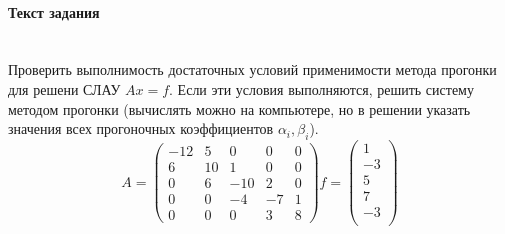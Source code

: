 \paragraph{Текст задания} ~\\
Проверить выполнимость достаточных условий применимости метода прогонки для решени СЛАУ $Ax = f$. Если эти условия выполняются, решить систему методом прогонки (вычислять можно на компьютере, но в решении указать значения всех прогоночных коэффициентов $\alpha_{i}, \beta_{i}$).
\[
  A =
  \begin{pmatrix}
    -12 & 5  &  0  & 0 & 0 \\
    6   & 10 &  1  & 0 & 0 \\
    0   & 6  & -10 & 2 & 0 \\
    0   & 0  & -4  & -7 & 1 \\
    0   & 0  &  0  & 3 & 8
  \end{pmatrix}
  f =
  \begin{pmatrix}
    1  \\
    -3 \\
    5  \\
    7  \\
    -3 \\
  \end{pmatrix}
\]

